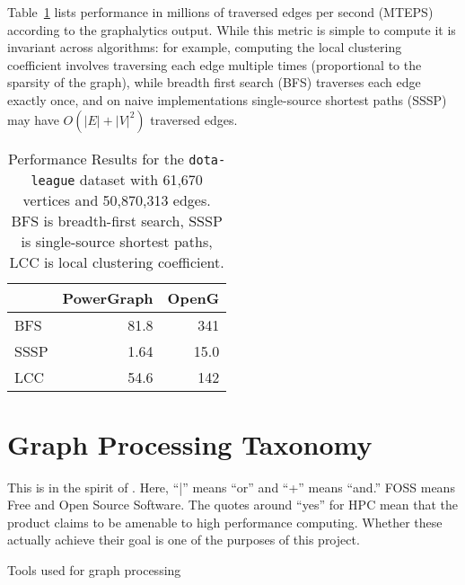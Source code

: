 \documentclass[11pt]{article}
\begin{document}
Table~\ref{tab:perf} lists performance in millions of traversed edges per second (MTEPS) according to the graphalytics output. While this metric is simple to compute it is invariant across algorithms: for example, computing the local clustering coefficient involves traversing each edge multiple times (proportional to the sparsity of the graph), while breadth first search (BFS) traverses each edge exactly once, and on na\:ive implementations single-source shortest paths (SSSP) may have $O(|E| + |V|^2)$ traversed edges.

\begin{table}[!htb]
	\centering
	\begin{tabular}{l|r|r|}
	 & PowerGraph & OpenG \\ \hline
	BFS & 81.8 & 341 \\ \hline
	SSSP & 1.64 & 15.0 \\ \hline
	LCC & 54.6 & 142 \\ \hline
	\end{tabular}
	\caption{Performance Results for the \texttt{dota-league} dataset with 61,670 vertices and 50,870,313 edges. BFS is breadth-first search, SSSP is single-source shortest paths, LCC is local clustering coefficient.}
	\label{tab:perf}
\end{table}

\section{Graph Processing Taxonomy}
This is in the spirit of \cite{Doekemeijer:2015:GPFSurvey}. Here, ``|'' means ``or'' and ``+'' means ``and.'' FOSS means Free and Open Source Software. The quotes around ``yes'' for HPC mean that the product claims to be amenable to high performance computing. Whether these actually achieve their goal is one of the purposes of this project.
\begin{table}[!htb]
	\begin{minipage}{\linewidth} %
		\centering
		\caption{Tools used for graph processing}
		\label{tab:frameworks}
	\end{minipage}
\end{table}
\end{document}

